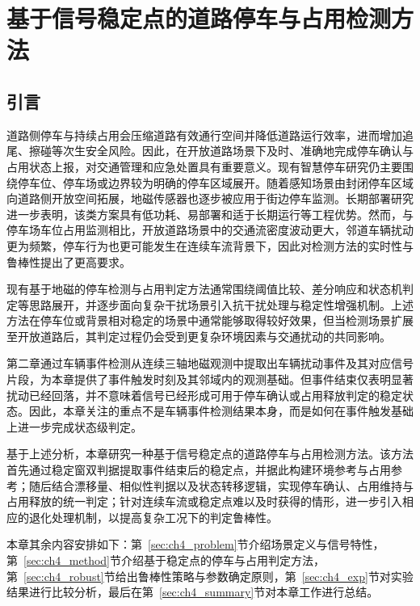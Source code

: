 \documentclass{xdupgthesis}
\begin{document}
\chapter{基于信号稳定点的道路停车与占用检测方法}
\label{ch:ch4_parking}

\section{引言}
\label{sec:ch4_intro}

道路侧停车与持续占用会压缩道路有效通行空间并降低道路运行效率，进而增加追尾、擦碰等次生安全风险。因此，在开放道路场景下及时、准确地完成停车确认与占用状态上报，对交通管理和应急处置具有重要意义。现有智慧停车研究仍主要围绕停车位、停车场或边界较为明确的停车区域展开\cite{diazogas2020spsurvey}。随着感知场景由封闭停车区域向道路侧开放空间拓展，地磁传感器也逐步被应用于街边停车监测\cite{ch4_gu2013streetparking}。长期部署研究进一步表明，该类方案具有低功耗、易部署和适于长期运行等工程优势\cite{ch4_huang2017easydeploy}。然而，与停车场车位占用监测相比，开放道路场景中的交通流密度波动更大，邻道车辆扰动更为频繁，停车行为也更可能发生在连续车流背景下，因此对检测方法的实时性与鲁棒性提出了更高要求。

现有基于地磁的停车检测与占用判定方法通常围绕阈值比较、差分响应和状态机判定等思路展开，并逐步面向复杂干扰场景引入抗干扰处理与稳定性增强机制\cite{ch4_wang2025parkingdetectreview}。上述方法在停车位或背景相对稳定的场景中通常能够取得较好效果，但当检测场景扩展至开放道路后，其判定过程仍会受到更复杂环境因素与交通扰动的共同影响。

第二章通过车辆事件检测从连续三轴地磁观测中提取出车辆扰动事件及其对应信号片段，为本章提供了事件触发时刻及其邻域内的观测基础。但事件结束仅表明显著扰动已经回落，并不意味着信号已经形成可用于停车确认或占用释放判定的稳定状态。因此，本章关注的重点不是车辆事件检测结果本身，而是如何在事件触发基础上进一步完成状态级判定。

基于上述分析，本章研究一种基于信号稳定点的道路停车与占用检测方法。该方法首先通过稳定窗双判据提取事件结束后的稳定点，并据此构建环境参考与占用参考；随后结合漂移量、相似性判据以及状态转移逻辑，实现停车确认、占用维持与占用释放的统一判定；针对连续车流或稳定点难以及时获得的情形，进一步引入相应的退化处理机制，以提高复杂工况下的判定鲁棒性。

本章其余内容安排如下：第~\ref{sec:ch4_problem}节介绍场景定义与信号特性，第~\ref{sec:ch4_method}节介绍基于稳定点的停车与占用判定方法，第~\ref{sec:ch4_robust}节给出鲁棒性策略与参数确定原则，第~\ref{sec:ch4_exp}节对实验结果进行比较分析，最后在第~\ref{sec:ch4_summary}节对本章工作进行总结。
\end{document}
